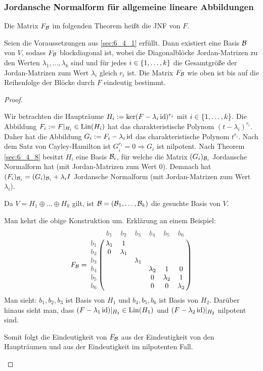 \subsubsection{Jordansche Normalform für allgemeine lineare Abbildungen}
\label{sec:6_4_9}

Die Matrix $F_\B$ im folgenden Theorem heißt die JNF von $F$. 


\begin{thm}
	Seien die Voraussetzungen aus \ref{sec:6_4_1} erfüllt. Dann existiert eine Basis $ \B $ von $ V $, sodass $ F_\B $ blockdiagonal ist, wobei die Diagonalblöcke Jordan-Matrizen zu den Werten $ \lambda_1, \ldots, \lambda_k $ sind und für jedes $ i \in \{ 1,\ldots,k \} $ die Gesamtgröße der Jordan-Matrizen zum Wert $ \lambda_i $ gleich $ r_i $ ist. Die Matrix $ F_\B $ wie oben ist bis auf die Reihenfolge der Blöcke durch $ F $ eindeutig bestimmt.
\end{thm}
\begin{proof}\
	\begin{description}[font = \normalfont]
		\item[Existenz von $ \B $:]
		Wir betrachten die Haupträume $ H_i := \ker(F-\lambda_i\operatorname{id})^{r_i} $ mit $ i \in \{ 1,\ldots,k \} $. Die Abbildung $ F_i := F|_{H_i} \in \operatorname{Lin}(H_i) $ hat das charakteristische Polynom $ (t-\lambda_i)^{r_i} $. Daher hat die Abbildung $ G_i := F_i - \lambda_i \operatorname{id} $ das charakteristische Polynom $ t^{r_i} $. Nach dem Satz von Cayley-Hamilton ist $ G_i^{r_i} = 0 \Rightarrow G_i $ ist nilpotent. Nach Theorem \ref{sec:6_4_8} besitzt $ H_i $ eine Basis $ \mathcal{B}_i $, für welche die Matrix $ (G_i)_{\mathcal{B}_i} $ Jordansche Normalform hat (mit Jordan-Matrizen zum Wert 0). Demnach hat $ (F_i)_{\mathcal{B}_i} = (G_i)_{\mathcal{B}_i} + \lambda_i I $ Jordansche Normalform (mit Jordan-Matrizen zum Wert $ \lambda_i $).
		
		Da $ V = H_1 \oplus \ldots \oplus H_k $ gilt, ist $ \mathcal{B} = (\mathcal{B}_1, \ldots, \mathcal{B}_k) $ die gesuchte Basis von $ V $.
		\item[Eindeutigkeit von $ F_\B $ (Beweisskizze):]
		Man kehrt die obige Konstruktion um. Erklärung an einem Beispiel:
		\begin{equation*}
			F_\B = \bordermatrix{
				& \bordernote{b_1} & \bordernote{b_2} & \bordernote{b_3} & \bordernote{b_4} & \bordernote{b_5} & \bordernote{b_6} \cr
				\bordernote{b_1} & \lambda_1 & 1 &&&& \cr
				\bordernote{b_2} & 0 & \lambda_1 &&&& \cr
				\bordernote{b_3} &&& \lambda_1 &&& \cr
				\bordernote{b_4} &&&& \lambda_2 & 1 & 0 \cr
				\bordernote{b_5} &&&& 0 & \lambda_2 & 1 \cr
				\bordernote{b_6} &&&& 0 & 0 & \lambda_2 \cr
			}
		\end{equation*}
		Man sieht: $ b_1,b_2,b_3 $ ist Basis von $ H_1 $ und $ b_4,b_5,b_6 $ ist Basis von $ H_2 $. Darüber hinaus sieht man, dass $ (F-\lambda_1\operatorname{id})|_{H_1} \in \operatorname{Lin}(H_1) $ und $ (F-\lambda_2\operatorname{id})|_{H_2} $ nilpotent sind.
		
		Somit folgt die Eindeutigkeit von $ F_\B $ aus der Eindeutigkeit von den Haupträumen und aus der Eindeutigkeit im nilpotenten Fall. \qedhere
	\end{description}
\end{proof}

